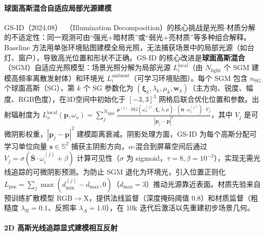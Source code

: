 \paragraph{球面高斯混合自适应局部光源建模}

GS-ID（2024.08）~\cite{2408_08524}（Illumination Decomposition）的核心挑战是光照-材质分解的不适定性：同一观测可由“强光+暗材质”或“弱光+亮材质”等多种组合解释。Baseline 方法用单张环境贴图建模全局光照，无法捕获场景中的局部光源（如台灯、窗户），导致高光位置和形状不正确。GS-ID 的核心改进是\textbf{球面高斯混合}（SGM）自适应光照模型：场景光照分解为局部光源 $L_i^{\text{local}}$（由 $N_{\text{light}}$ 个 SGM 建模高频率离散发射体）和环境光 $L_i^{\text{ambient}}$（可学习环境贴图）。每个 SGM 包含 $n_{\text{SG}}$ 个球面高斯（SG），第 $k$ 个 SG 参数化为 $(\boldsymbol{\xi}_k, \lambda_k, \mu_k, \boldsymbol{w}_k)$（主方向、锐度、幅度、RGB色度），在3D空间中初始化于 $[-3,3]^3$ 网格后联合优化位置和参数。出射辐射度为 $L_o^{\text{local}}(\mathbf{p}, \omega_o) = \sum_j^{N_{\text{light}}} \frac{\boldsymbol{\rho}^{(j)} \cdot \text{SG}(\omega_o^{(j)}; \boldsymbol{\xi}, \lambda, \mu) \cdot (\mathbf{n} \cdot \omega_i^{(j)}) \cdot V_j}{|\mathbf{p}_j - \mathbf{p}|^2}$，其中 $V_j$ 是可微阴影权重，$|\mathbf{p}_j - \mathbf{p}|^2$ 建模距离衰减。阴影处理方面，GS-ID 为每个高斯分配可学习单位向量 $\mathbf{s} \in \mathbb{S}^2$ 捕获主阴影方向，$\alpha$-混合到屏幕空间后通过 $V_j = \sigma(\mathbf{\bar{S}} \cdot \omega_i^{(j)} + \beta)$ 计算可见性（$\sigma$ 为 sigmoid，$\tau=8, \beta=10^{-3}$），实现无需光线追踪的可微阴影预测。为防止 SGM 退化为环境光，引入位置正则化 $L_{\text{pos}} = \sum_j \max(d_{\min}^{(j)} - d_{\max}, 0)$（$d_{\max}=3$）推动光源靠近表面。材质先验来自预训练扩散模型 RGB$\rightarrow$X，提供法线监督（深度掩码阈值 0.8）和材质监督（粗糙度 $\lambda_R=0.1$、反照率 $\lambda_A=1.0$），在 10k 迭代后激活以先重建初步场景几何。

\paragraph{2D 高斯光线追踪显式建模相互反射}

